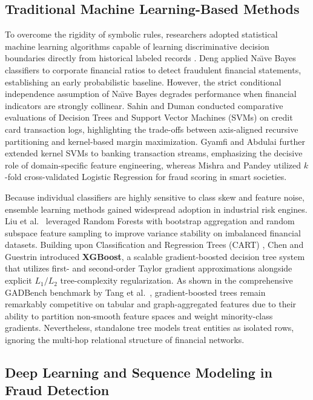 \documentclass[10pt,a4paper,twocolumn]{article}
\begin{document}
\subsection{Traditional Machine Learning-Based Methods}

To overcome the rigidity of symbolic rules, researchers adopted statistical machine learning algorithms capable of learning discriminative decision boundaries directly from historical labeled records \cite{ref5}. Deng \cite{ref19} applied Na\"{\i}ve Bayes classifiers to corporate financial ratios to detect fraudulent financial statements, establishing an early probabilistic baseline. However, the strict conditional independence assumption of Na\"{\i}ve Bayes degrades performance when financial indicators are strongly collinear. Sahin and Duman \cite{ref20} conducted comparative evaluations of Decision Trees and Support Vector Machines (SVMs) on credit card transaction logs, highlighting the trade-offs between axis-aligned recursive partitioning and kernel-based margin maximization. Gyamfi and Abdulai \cite{ref22} further extended kernel SVMs to banking transaction streams, emphasizing the decisive role of domain-specific feature engineering, whereas Mishra and Pandey \cite{ref23} utilized $k$-fold cross-validated Logistic Regression for fraud scoring in smart societies.

Because individual classifiers are highly sensitive to class skew and feature noise, ensemble learning methods gained widespread adoption in industrial risk engines. Liu et al.\ \cite{ref21} leveraged Random Forests with bootstrap aggregation and random subspace feature sampling to improve variance stability on imbalanced financial datasets. Building upon Classification and Regression Trees (CART) \cite{ref40}, Chen and Guestrin \cite{ref39} introduced \textbf{XGBoost}, a scalable gradient-boosted decision tree system that utilizes first- and second-order Taylor gradient approximations alongside explicit $L_1/L_2$ tree-complexity regularization. As shown in the comprehensive GADBench benchmark by Tang et al.\ \cite{ref38}, gradient-boosted trees remain remarkably competitive on tabular and graph-aggregated features due to their ability to partition non-smooth feature spaces and weight minority-class gradients. Nevertheless, standalone tree models treat entities as isolated rows, ignoring the multi-hop relational structure of financial networks.

\subsection{Deep Learning and Sequence Modeling in Fraud Detection}
\end{document}
